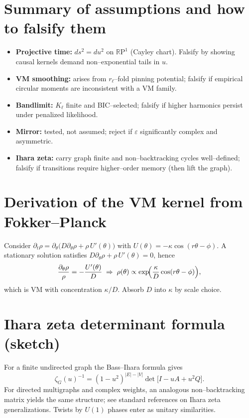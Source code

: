 \documentclass[11pt]{article}
\newcommand{\RP}{\mathbb{R}\mathrm{P}^1}
\begin{document}
\section{Summary of assumptions and how to falsify them}
\begin{itemize}[leftmargin=2em]
\item \textbf{Projective time:} $ds^2=du^2$ on $\RP$ (Cayley chart). Falsify by showing causal kernels demand non--exponential tails in $u$.
\item \textbf{VM smoothing:} arises from $r_\ell$--fold pinning potential; falsify if empirical circular moments are inconsistent with a VM family.
\item \textbf{Bandlimit:} $K_\ell$ finite and BIC--selected; falsify if higher harmonics persist under penalized likelihood.
\item \textbf{Mirror:} tested, not assumed; reject if $\varepsilon$ significantly complex and asymmetric.
\item \textbf{Ihara zeta:} carry graph finite and non--backtracking cycles well--defined; falsify if transitions require higher--order memory (then lift the graph).
\end{itemize}

\appendix
\section{Derivation of the VM kernel from Fokker--Planck}
Consider $\partial_t \rho=\partial_\theta\bigl(D\partial_\theta \rho + \rho\,U'(\theta)\bigr)$ with $U(\theta)=-\kappa\cos(r\theta-\phi)$.
A stationary solution satisfies $D\partial_\theta \rho + \rho\,U'(\theta)=0$, hence
\begin{equation}
\frac{\partial_\theta \rho}{\rho}=-\frac{U'(\theta)}{D}\;\Rightarrow\;\rho(\theta)\propto \exp\!\Bigl(\frac{\kappa}{D}\cos(r\theta-\phi)\Bigr),
\end{equation}
which is VM with concentration $\kappa/D$. Absorb $D$ into $\kappa$ by scale choice.

\section{Ihara zeta determinant formula (sketch)}
For a finite undirected graph the Bass--Ihara formula gives
\begin{equation}
\zeta_G(u)^{-1}=(1-u^2)^{|E|-|V|}\det\!\bigl[I - u A + u^2 Q\bigr].
\end{equation}
For directed multigraphs and complex weights, an analogous non--backtracking matrix yields the same structure; see standard references on Ihara zeta generalizations. Twists by $U(1)$ phases enter as unitary similarities.
\end{document}

